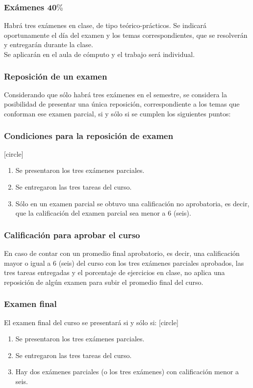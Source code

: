 \documentclass[12pt]{beamer}
\begin{document}
\begin{frame}
\frametitle{Exámenes $\mathbf{40\%}$}
Habrá tres exámenes en clase, de tipo teórico-prácticos. Se indicará oportunamente el día del examen y los temas correspondientes, que se resolverán y entregarán durante la clase.
\\
\bigskip
Se aplicarán en el aula de cómputo y el trabajo será individual.
\end{frame}
\begin{frame}
\frametitle{Reposición de un examen}
Considerando que sólo habrá tres exámenes en el semestre, se considera la posibilidad de presentar una única reposición, correspondiente a los temas que conforman ese examen parcial, si y sólo si se cumplen los siguientes puntos:
\end{frame}
\begin{frame}
\frametitle{Condiciones para la reposición de examen}
[circle]
\begin{enumerate}[<+->]
\item Se presentaron los tres exámenes parciales.
\item Se entregaron las tres tareas del curso.
\item Sólo en un examen parcial se obtuvo una calificación no aprobatoria, es decir, que la calificación del examen parcial sea menor a $6$ (seis).
\end{enumerate}
\end{frame}
\begin{frame}
\frametitle{Calificación para aprobar el curso}
En caso de contar con un promedio final aprobatorio, es decir, una calificación mayor o igual a $6$ (seis) del curso con los tres exámenes parciales aprobados, las tres tareas entregadas y el porcentaje de ejercicios en clase, \alert{no aplica una reposición de algún examen} para subir el promedio final del curso.
\end{frame}
\begin{frame}
\frametitle{Examen final}
El examen final del curso se presentará si y sólo si:
[circle]
\begin{enumerate}[<+->]
\item Se presentaron los tres exámenes parciales.
\item Se entregaron las tres tareas del curso.
\item Hay dos exámenes parciales (o los tres exámenes) con calificación menor a seis.
\end{enumerate}
\end{frame}
\end{document}
